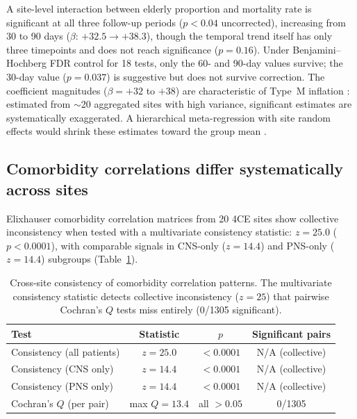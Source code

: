 \documentclass{article}
\begin{document}
A site-level interaction between elderly proportion and mortality rate is
significant at all three follow-up periods ($p < 0.04$ uncorrected),
increasing from 30 to 90 days ($\beta$: $+32.5 \to +38.3$), though the
temporal trend itself has only three timepoints and does not reach
significance ($p = 0.16$).  Under Benjamini--Hochberg FDR control for 18
tests, only the 60- and 90-day values survive; the 30-day value
($p = 0.037$) is suggestive but does not survive correction.  The
coefficient magnitudes ($\beta = +32$ to $+38$) are characteristic of
Type~M inflation \cite{gelman2014typeMS}: estimated from $\sim$20
aggregated sites with high variance, significant estimates are
systematically exaggerated.  A hierarchical meta-regression with site random
effects would shrink these estimates toward the group mean
\cite{gelman2012multilevel}.


\subsection{Comorbidity correlations differ systematically across sites}

Elixhauser comorbidity correlation matrices \cite{elixhauser1998} from 20
4CE sites show collective inconsistency when tested with a multivariate
consistency statistic: $z = 25.0$ ($p < 0.0001$), with comparable signals
in CNS-only ($z = 14.4$) and PNS-only ($z = 14.4$) subgroups
(Table~\ref{tab:consistency}).

\begin{table}[t]
\centering
\caption{Cross-site consistency of comorbidity correlation patterns.  The
multivariate consistency statistic detects collective inconsistency
($z = 25$) that pairwise Cochran's $Q$ tests miss entirely (0/1305
significant).}
\label{tab:consistency}
\begin{tabular}{lccc}
\toprule
Test & Statistic & $p$ & Significant pairs \\
\midrule
Consistency (all patients) & $z = 25.0$ & $< 0.0001$ & N/A (collective) \\
Consistency (CNS only) & $z = 14.4$ & $< 0.0001$ & N/A (collective) \\
Consistency (PNS only) & $z = 14.4$ & $< 0.0001$ & N/A (collective) \\
Cochran's $Q$ (per pair) & max $Q = 13.4$ & all $> 0.05$ & 0/1305 \\
\bottomrule
\end{tabular}
\end{table}
\end{document}
